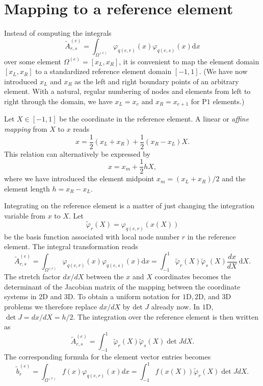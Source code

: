 \documentclass[../main.tex]{subfiles}
\begin{document}
	\section[Mapping to a reference element]{Mapping to a reference element}
	\label{sec:sec_3_8}
	Instead of computing the integrals
	$$
	\tilde{A}_{r, s}^{(e)}=\int_{\Omega^{(e)}} \varphi_{q(e, r)}(x) \varphi_{q(e, s)}(x) \mathrm{d} x
	$$
	over some element $\Omega^{(e)}=\left[x_{L}, x_{R}\right]$, it is convenient to map the element domain $\left[x_{L}, x_{R}\right]$ to a standardized reference element domain $[-1,1]$. (We have now introduced $x_{L}$ and $x_{R}$ as the left and right boundary points of an arbitrary element. With a natural, regular numbering of nodes and elements from left to right through the domain, we have $x_{L}=x_{e}$ and $x_{R}=x_{e+1}$ for $\mathrm{P} 1$ elements.)
	
	Let $X \in[-1,1]$ be the coordinate in the reference element. A linear or \textit{affine mapping} from $X$ to $x$ reads
	\begin{equation}\label{eqa61}
		x=\frac{1}{2}\left(x_{L}+x_{R}\right)+\frac{1}{2}\left(x_{R}-x_{L}\right) X.
	\end{equation}
	This relation can alternatively be expressed by
	\begin{equation}\label{eqa62}
		x=x_{m}+\frac{1}{2} h X,
	\end{equation}
	where we have introduced the element midpoint $x_{m}=\left(x_{L}+x_{R}\right) / 2$ and the element length $h=x_{R}-x_{L}$.
	
	Integrating on the reference element is a matter of just changing the integration variable from $x$ to $X$. Let
	\begin{equation}\label{eqa63}
		\tilde{\varphi}_{r}(X)=\varphi_{q(e, r)}(x(X))
	\end{equation}
	be the basis function associated with local node number $r$ in the reference element. The integral transformation reads
	\begin{equation}\label{eqa64}
		\tilde{A}_{r, s}^{(e)}=\int_{\Omega^{(e)}} \varphi_{q(e, r)}(x) \varphi_{q(e, s)}(x) \mathrm{d} x=\int_{-1}^{1} \tilde{\varphi}_{r}(X) \tilde{\varphi}_{s}(X) \frac{d x}{d X} \mathrm{~d} X.
	\end{equation}
	The stretch factor $d x / d X$ between the $x$ and $X$ coordinates becomes the determinant of the Jacobian matrix of the mapping between the coordinate systems in $2 \mathrm{D}$ and 3D. To obtain a uniform notation for $1 \mathrm{D}, 2 \mathrm{D}$, and 3D problems we therefore replace $d x / d X$ by det $J$ already now. In $1 \mathrm{D}$, $\operatorname{det} J=d x / d X=h / 2$. The integration over the reference element is then written as
	\begin{equation}\label{eqa65}
		\tilde{A}_{r, s}^{(e)}=\int_{-1}^{1} \tilde{\varphi}_{r}(X) \tilde{\varphi}_{s}(X) \operatorname{det} J d X.
	\end{equation}
	The corresponding formula for the element vector entries becomes
	\begin{equation}\label{eqa66}
		\tilde{b}_{r}^{(e)}=\int_{\Omega^{(e)}} f(x) \varphi_{q(e, r)}(x) d x=\int_{-1}^{1} f(x(X)) \tilde{\varphi}_{r}(X) \operatorname{det} J d X.
	\end{equation}
	
\end{document}
